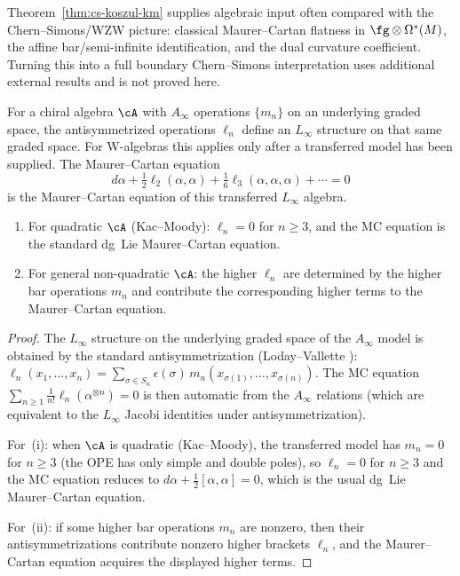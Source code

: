\begin{remark}
\label{rem:cs-km-physical}
Theorem~\ref{thm:cs-koszul-km} supplies algebraic input often
compared with the Chern--Simons/WZW picture: classical
Maurer--Cartan flatness in $\fg \otimes \Omega^*(M)$, the affine bar/semi-infinite
identification, and the dual curvature coefficient. Turning this
into a full boundary Chern--Simons interpretation uses additional
external results and is not proved here.
\end{remark}

\begin{theorem}
\label{thm:linf-mc-flatness}
For a chiral algebra $\cA$ with $A_\infty$ operations
$\{m_n\}$ on an underlying graded space, the antisymmetrized
operations $\ell_n$ define an $L_\infty$ structure on that same
graded space. For W-algebras this applies only after a transferred
model has been supplied. The Maurer--Cartan
equation
\[
d\alpha + \tfrac{1}{2}\ell_2(\alpha, \alpha)
+ \tfrac{1}{6}\ell_3(\alpha, \alpha, \alpha)
+ \cdots = 0
\]
is the Maurer--Cartan equation of this transferred
$L_\infty$ algebra.
\begin{enumerate}[label=\textup{(\roman*)}]
\item For quadratic $\cA$
 \textup{(}Kac--Moody\textup{)}: $\ell_n = 0$ for
 $n \geq 3$, and the MC equation is the standard
 dg~Lie Maurer--Cartan equation.
\item For general non-quadratic $\cA$: the higher
 $\ell_n$ are determined by the higher bar operations
 $m_n$ and contribute the corresponding higher terms to the
 Maurer--Cartan equation.
\end{enumerate}
\end{theorem}

\begin{proof}
The $L_\infty$ structure on the underlying graded space of the
$A_\infty$ model is obtained by the standard
antisymmetrization (Loday--Vallette \cite[Thm.~10.1.13]{LV12}):
$\ell_n(x_1, \ldots, x_n) = \sum_{\sigma \in S_n}
\epsilon(\sigma)\, m_n(x_{\sigma(1)}, \ldots,
x_{\sigma(n)})$. The MC equation
$\sum_{n \geq 1} \frac{1}{n!}\ell_n(\alpha^{\otimes n})
= 0$ is then automatic from the $A_\infty$
relations (which are equivalent to the $L_\infty$
Jacobi identities under antisymmetrization).

For~(i): when $\cA$ is quadratic (Kac--Moody), the
transferred model has $m_n = 0$ for $n \geq 3$
(the OPE has only simple and double poles), so
$\ell_n = 0$ for $n \geq 3$ and the MC equation
reduces to $d\alpha + \frac{1}{2}[\alpha, \alpha] = 0$,
which is the usual dg~Lie Maurer--Cartan equation.

For~(ii): if some higher bar operations $m_n$ are nonzero, then
their antisymmetrizations contribute nonzero higher brackets
$\ell_n$, and the Maurer--Cartan equation acquires the displayed
higher terms.
\end{proof}

